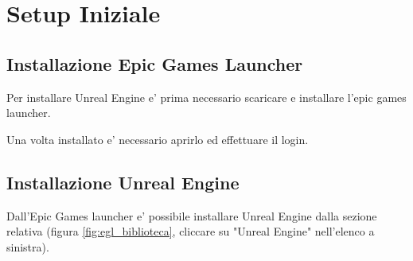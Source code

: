 \chapter{Setup Iniziale}


    \section{Installazione Epic Games Launcher}

        Per installare Unreal Engine e' prima necessario scaricare e installare l'epic games launcher.

        Una volta installato e' necessario aprirlo ed effettuare il login.


    \section{Installazione Unreal Engine}

        Dall'Epic Games launcher e' possibile installare Unreal Engine dalla sezione relativa (figura \ref{fig:egl_biblioteca}, cliccare su "Unreal Engine" nell'elenco a sinistra).

